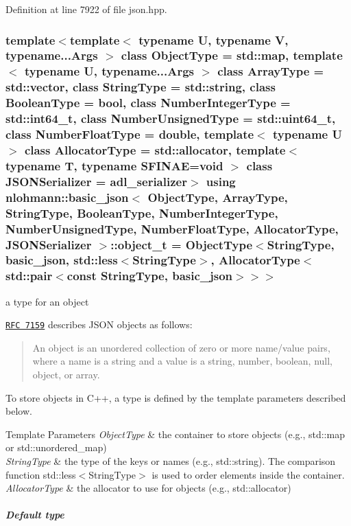 Definition at line 7922 of file json.\+hpp.

\subsubsection[{\texorpdfstring{object\+\_\+t}{object_t}}]{\setlength{\rightskip}{0pt plus 5cm}template$<$template$<$ typename U, typename V, typename...\+Args $>$ class Object\+Type = std\+::map, template$<$ typename U, typename...\+Args $>$ class Array\+Type = std\+::vector, class String\+Type  = std\+::string, class Boolean\+Type  = bool, class Number\+Integer\+Type  = std\+::int64\+\_\+t, class Number\+Unsigned\+Type  = std\+::uint64\+\_\+t, class Number\+Float\+Type  = double, template$<$ typename U $>$ class Allocator\+Type = std\+::allocator, template$<$ typename T, typename S\+F\+I\+N\+A\+E=void $>$ class J\+S\+O\+N\+Serializer = adl\+\_\+serializer$>$ using {\bf nlohmann\+::basic\+\_\+json}$<$ Object\+Type, Array\+Type, String\+Type, Boolean\+Type, Number\+Integer\+Type, Number\+Unsigned\+Type, Number\+Float\+Type, Allocator\+Type, J\+S\+O\+N\+Serializer $>$\+::{\bf object\+\_\+t} =  Object\+Type$<$String\+Type, {\bf basic\+\_\+json}, std\+::less$<$String\+Type$>$, Allocator\+Type$<$std\+::pair$<$const String\+Type, {\bf basic\+\_\+json}$>$$>$$>$}\hypertarget{classnlohmann_1_1basic__json_a3cdea044cc3ecba1c4f9874a89daf6e4}{}\label{classnlohmann_1_1basic__json_a3cdea044cc3ecba1c4f9874a89daf6e4}


a type for an object 

\href{http://rfc7159.net/rfc7159}{\tt R\+FC 7159} describes J\+S\+ON objects as follows\+: \begin{quote}
An object is an unordered collection of zero or more name/value pairs, where a name is a string and a value is a string, number, boolean, null, object, or array. \end{quote}


To store objects in C++, a type is defined by the template parameters described below.


\begin{DoxyTemplParams}{Template Parameters}
{\em Object\+Type} & the container to store objects (e.\+g., {\ttfamily std\+::map} or {\ttfamily std\+::unordered\+\_\+map}) \\
\hline
{\em String\+Type} & the type of the keys or names (e.\+g., {\ttfamily std\+::string}). The comparison function {\ttfamily std\+::less$<$String\+Type$>$} is used to order elements inside the container. \\
\hline
{\em Allocator\+Type} & the allocator to use for objects (e.\+g., {\ttfamily std\+::allocator})\\
\hline
\end{DoxyTemplParams}
\subparagraph*{Default type}

